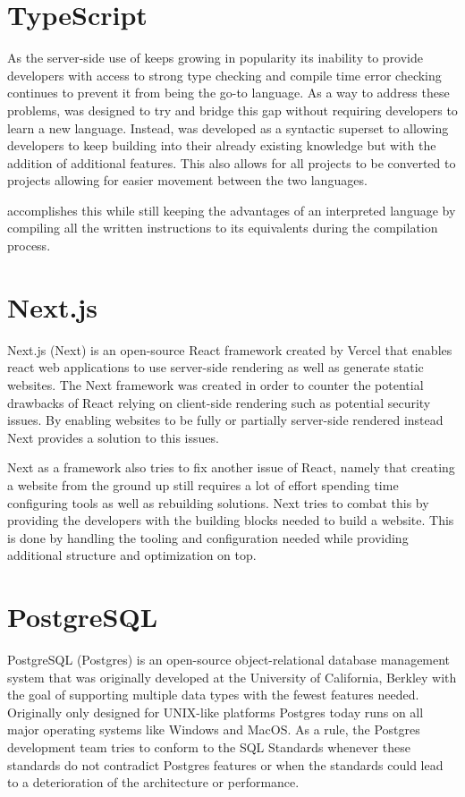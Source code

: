 \section*{TypeScript}
As the server-side use of \javascript{} keeps growing in popularity its inability to provide developers with access to strong type checking and compile time error checking continues to prevent it from being the go-to language.
As a way to address these problems, \typescript{} was designed to try and bridge this gap without requiring developers to learn a new language.
Instead, \typescript{} was developed as a syntactic superset to \javascript{} allowing developers to keep building into their already existing knowledge but with the addition of additional features. 
This also allows for all \javascript{} projects to be converted to \typescript{} projects allowing for easier movement between the two languages\cite{TypeScript}. 

\typescript{} accomplishes this while still keeping the advantages of an interpreted language by compiling all the written instructions to its \javascript{} equivalents during the compilation process.

\section*{Next.js}
Next.js (Next) is an open-source React framework created by Vercel that enables react web applications to use server-side rendering as well as generate static websites. The Next framework was created in order to counter the potential drawbacks of React relying on client-side rendering such as potential security issues. By enabling websites to be fully or partially server-side rendered instead Next provides a solution to this issues\cite {Nextjs_Docks}. 

Next as a framework also tries to fix another issue of React, namely that creating a website from the ground up still requires a lot of effort spending time configuring tools as well as rebuilding solutions. 
Next tries to combat this by providing the developers with the building blocks needed to build a website.
This is done by handling the tooling and configuration needed while providing additional structure and optimization on top\cite{Nextjs_Docks}.


\section*{PostgreSQL}
PostgreSQL (Postgres) is an open-source object-relational database management system that was originally developed at the University of California, Berkley with the goal of supporting multiple data types with the fewest features needed. Originally only designed for UNIX-like platforms Postgres today runs on all major operating systems like Windows and MacOS\cite{Postgres_Docs}.
As a rule, the Postgres development team tries to conform to the SQL Standards whenever these standards do not contradict Postgres features or when the standards could lead to a deterioration of the architecture or performance\cite{Postgres_Docs}. 

